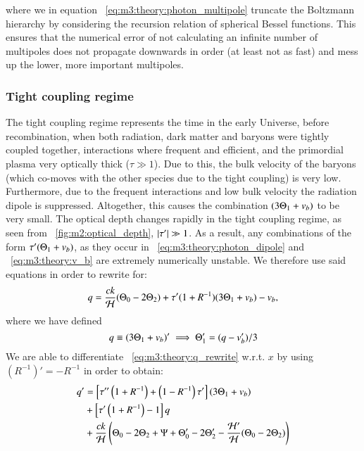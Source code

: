     where we in equation ~\cref{eq:m3:theory:photon_multipole} truncate the Boltzmann hierarchy by considering the recursion relation of spherical Bessel functions. This ensures that the numerical error of not calculating an infinite number of multipoles does not propagate downwards in order (at least not as fast) and mess up the lower, more important multipoles. 

\subsubsection{Tight coupling regime}\label{sec:m3:theory:tight_coupling}
    The tight coupling regime represents the time in the early Universe, before recombination, when both radiation, dark matter and baryons were tightly coupled together, interactions where frequent and efficient, and the primordial plasma very optically thick ($\tau\gg1$). Due to this, the bulk velocity of the baryons (which co-moves with the other species due to the tight coupling) is very low. Furthermore, due to the frequent interactions and low bulk velocity the radiation dipole is suppressed. Altogether, this causes the combination $(3\Theta_1+v_b)$ to be very small. The optical depth changes rapidly in the tight coupling regime, as seen from ~\cref{fig:m2:optical_depth}, $\abs{\tau'}\gg1$. As a result, any combinations of the form $\tau'(\Theta_1+v_b)$, as they occur in ~\cref{eq:m3:theory:photon_dipole} and ~\cref{eq:m3:theory:v_b} are extremely numerically unstable. We therefore use said equations in order to rewrite for:
    \begin{equation}\label{eq:m3:theory:q_rewrite}
        q = \frac{ck}{\mathcal{H}}(\Theta_0-2\Theta_2) + \tau'(1+R^{-1})(3\Theta_1+v_b) - v_b,
    \end{equation}
    where we have defined 
    \begin{equation}\label{eq:m3:theory:q_def}
        q\equiv (3\Theta_1+v_b)' \implies \Theta_1'=(q-v_b')/3
    \end{equation}
    We are able to differentiate ~\cref{eq:m3:theory:q_rewrite} w.r.t. $x$ by using $(R^{-1})' = -R^{-1}$ in order to obtain:
    \begin{equation}\label{eq:m3:theory:q_derivative}
        \begin{split}
            q' &= \left[\tau''\left(1+R^{-1}\right)+\left(1-R^{-1}\right)\tau'\right](3\Theta_1+v_b)\\
            &+\left[\tau'\left(1+R^{-1}\right)-1\right]q \\
            &+\frac{ck}{\mathcal{H}}\left(\Theta_0-2\Theta_2+\Psi+\Theta_0'-2\Theta_2'-\frac{\mathcal{H}'}{\mathcal{H}}(\Theta_0-2\Theta_2)\right)
        \end{split}
    \end{equation}
